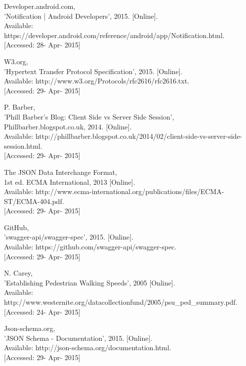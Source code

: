 \documentclass[]{article}
\begin{document}
\begin{enumerate}[label={[\arabic*]}]
\item  Developer.android.com,\\{} 'Notification | Android Developers', 2015. [Online].\\{} Available: https://developer.android.com/reference/android/app/Notification.html.\\{} [Accessed: 28- Apr- 2015]

\item  W3.org, \\{}'Hypertext Transfer Protocol Specification', 2015. [Online].\\{} Available: http://www.w3.org/Protocols/rfc2616/rfc2616.txt. \\{}[Accessed: 29- Apr- 2015]

\item P. Barber,\\{} 'Phill Barber's Blog: Client Side vs Server Side Session',\\{} Phillbarber.blogspot.co.uk, 2014. [Online].\\{} Available: http://phillbarber.blogspot.co.uk/2014/02/client-side-vs-server-side-session.html. \\{}[Accessed: 29- Apr- 2015]

\item The JSON Data Interchange Format, \\{}1st ed. ECMA International, 2013 [Online]. \\{}Available: http://www.ecma-international.org/publications/files/ECMA-ST/ECMA-404.pdf.\\{} [Accessed: 29- Apr- 2015]

\item  GitHub, \\{}'swagger-api/swagger-spec', 2015. [Online]. \\{}Available: https://github.com/swagger-api/swagger-spec.\\{} [Accessed: 29- Apr- 2015]

\item N. Carey,\\{} 'Establishing Pedestrian Walking Speeds', 2005 [Online].\\{} Available: http://www.westernite.org/datacollectionfund/2005/psu\_ped\_summary.pdf. \\{}[Accessed: 24- Apr- 2015]

\item  Json-schema.org, \\{}'JSON Schema - Documentation', 2015. [Online].\\{} Available: http://json-schema.org/documentation.html. \\{}[Accessed: 29- Apr- 2015]

\end{enumerate}
\end{document}
